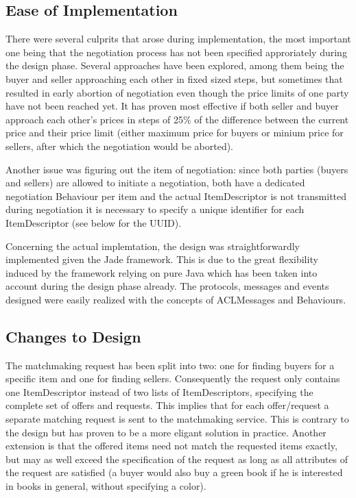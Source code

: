 \documentclass[a4paper,11pt]{article}
\begin{document}
\subsection{Ease of Implementation}
There were several culprits that arose during implementation, the most important one being that the negotiation process has not been specified approriately during the design phase. Several approaches have been explored, among them being the buyer and seller approaching each other in fixed sized steps, but sometimes that resulted in early abortion of negotiation even though the price limits of one party have not been reached yet. It has proven most effective if both seller and buyer approach each other's prices in steps of 25\% of the difference between the current price and their price limit (either maximum price for buyers or minium price for sellers, after which the negotiation would be aborted). 

Another issue was figuring out the item of negotiation: since both parties (buyers and sellers) are allowed to initiate a negotiation, both have a dedicated negotiation Behaviour per item and the actual ItemDescriptor is not transmitted during negotiation it is necessary to specify a unique identifier for each ItemDescriptor (see below for the UUID).

Concerning the actual implemtation, the design was straightforwardly implemented given the Jade framework. This is due to the great flexibility induced by the framework relying on pure Java which has been taken into account during the design phase already. The protocols, messages and events designed were easily realized with the concepts of ACLMessages and Behaviours.

\subsection{Changes to Design}
The matchmaking request has been split into two: one for finding buyers for a specific item and one for finding sellers. Consequently the request only contains one ItemDescriptor instead of two lists of ItemDescriptors, specifying the complete set of offers and requests. This implies that for each offer/request a separate matching request is sent to the matchmaking service. This is contrary to the design but has proven to be a more eligant solution in practice. Another extension is that the offered items need not match the requested items exactly, but may as well exceed the specification of the request as long as all attributes of the request are satisfied (a buyer would also buy a green book if he is interested in books in general, without specifying a color).
\end{document}
